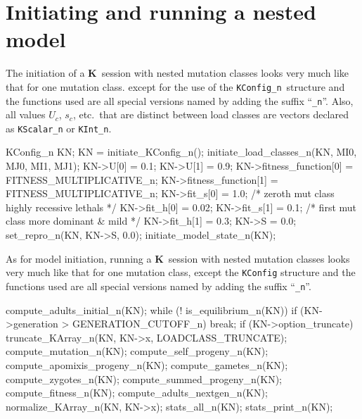 \documentclass[12pt,twoside,letterpaper,fleqn]{report}
\numberwithin{equation}{section}  %
\newcommand{\K}{{\bf K}}
\newcommand{\KConfign}{\mbox{\tt KConfig\_n}}
\begin{document}
{%
\section{Initiating and running a nested model}

The initiation of a \K\ session with nested mutation classes looks very much
like that for one mutation class.   except for the use of the \KConfign\
structure and the functions used are all special versions named by adding the
suffix ``\lstinline{_n}''.  Also, all values $U_c$, $s_c$, etc.\ that are
distinct between load classes are vectors declared as \lstinline{KScalar_n} or
\lstinline{KInt_n}.

\begin{C}[gobble=4]
    KConfig_n KN;
    KN = initiate_KConfig_n();
    initiate_load_classes_n(KN, MI0, MJ0, MI1, MJ1);
    KN->U[0] = 0.1;
    KN->U[1] = 0.9;
    KN->fitness_function[0] = FITNESS_MULTIPLICATIVE_n;
    KN->fitness_function[1] = FITNESS_MULTIPLICATIVE_n;
    KN->fit_s[0] = 1.0;  /* zeroth mut class highly recessive lethals */
    KN->fit_h[0] = 0.02;
    KN->fit_s[1] = 0.1;  /* first mut class more dominant & mild */
    KN->fit_h[1] = 0.3;
    KN->S = 0.0;
    set_repro_n(KN, KN->S, 0.0);
    initiate_model_state_n(KN);
\end{C}

As for model initiation, running a \K\ session with nested mutation classes
looks very much like that for one mutation class, except the
\lstinline{KConfig} structure and the functions used are all special versions
named by adding the suffix ``\lstinline{_n}''.

\begin{C}[gobble=4]
    compute_adults_initial_n(KN);
    while (! is_equilibrium_n(KN)) {
        if (KN->generation > GENERATION_CUTOFF_n)
            break;
        if (KN->option_truncate)
            truncate_KArray_n(KN, KN->x, LOADCLASS_TRUNCATE);
        compute_mutation_n(KN);
        compute_self_progeny_n(KN);
        compute_apomixis_progeny_n(KN);
        compute_gametes_n(KN);
        compute_zygotes_n(KN);
        compute_summed_progeny_n(KN);
        compute_fitness_n(KN);
        compute_adults_nextgen_n(KN);
        normalize_KArray_n(KN, KN->x);
    }
    stats_all_n(KN);
    stats_print_n(KN);
\end{C}


}
\end{document}
